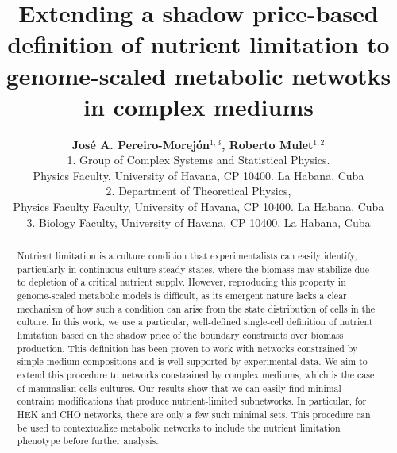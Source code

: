 \documentclass[11pt, letterpaper]{article}
\title{\textbf{Extending a shadow price-based definition of nutrient limitation to genome-scaled metabolic netwotks in complex mediums}}
\date{}
\author{
  \textbf{Jos\'e A. Pereiro-Morej\'on$^{1,3}$, Roberto Mulet$^{1,2}$} \\
  \small{1. Group of Complex Systems and Statistical Physics.} \\
  \small{Physics Faculty, University of Havana, CP 10400. La Habana, Cuba} \\
  \small{2. Department of Theoretical Physics, }\\
  \small{Physics Faculty Faculty, University of Havana, CP 10400. La Habana, Cuba} \\
  \small{3. Biology Faculty, University of Havana, CP 10400. La Habana, Cuba} \\
}
\begin{document}
\maketitle

\begin{abstract}
	Nutrient limitation is a culture condition that experimentalists can easily identify, particularly in continuous culture steady states, where the biomass may stabilize due to depletion of a critical nutrient supply. However, reproducing this property in genome-scaled metabolic models is difficult, as its emergent nature lacks a clear mechanism of how such a condition can arise from the state distribution of cells in the culture. In this work, we use a particular, well-defined single-cell definition of nutrient limitation based on the shadow price of the boundary constraints over biomass production. This definition has been proven to work with networks constrained by simple medium compositions and is well supported by experimental data. We aim to extend this procedure to networks constrained by complex mediums, which is the case of mammalian cells cultures. Our results show that we can easily find minimal contraint modifications that produce nutrient-limited subnetworks. In particular, for HEK and CHO networks, there are only a few such minimal sets. This procedure can be used to contextualize metabolic networks to include the nutrient limitation phenotype before further analysis.
\end{abstract}






\end{document}
